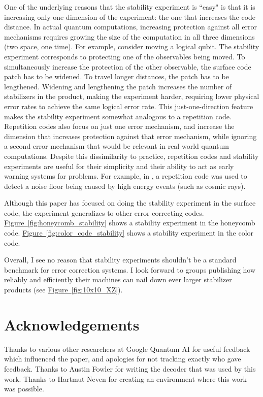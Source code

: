 \documentclass[onecolumn,unpublished,a4paper]{quantumarticle}
\theoremstyle{definition}
\theoremstyle{definition}
\theoremstyle{definition}
\newcommand{\fig}[1]{\hyperref[fig:#1]{Figure~\ref*{fig:#1}}}
\begin{document}
One of the underlying reasons that the stability experiment is ``easy" is that it is increasing only one dimension of the experiment: the one that increases the code distance.
In actual quantum computations, increasing protection against all error mechanisms requires growing the size of the computation in all three dimensions (two space, one time).
For example, consider moving a logical qubit.
The stability experiment corresponds to protecting one of the observables being moved.
To simultaneously increase the protection of the other observable, the surface code patch has to be widened.
To travel longer distances, the patch has to be lengthened.
Widening and lengthening the patch increases the number of stabilizers in the product, making the experiment harder, requiring lower physical error rates to achieve the same logical error rate.
This just-one-direction feature makes the stability experiment somewhat analogous to a repetition code.
Repetition codes also focus on just one error mechanism, and increase the dimension that increases protection against that error mechanism, while ignoring a second error mechanism that would be relevant in real world quantum computations.
Despite this dissimilarity to practice, repetition codes and stability experiments are useful for their simplicity and their ability to act as early warning systems for problems.
For example, in \cite{gqai2022suppressing}, a repetition code was used to detect a noise floor being caused by high energy events (such as cosmic rays).

Although this paper has focused on doing the stability experiment in the surface code, the experiment generalizes to other error correcting codes.
\fig{honeycomb_stability} shows a stability experiment in the honeycomb code.
\fig{color_code_stability} shows a stability experiment in the color code.

Overall, I see no reason that stability experiments shouldn't be a standard benchmark for error correction systems.
I look forward to groups publishing how reliably and efficiently their machines can nail down ever larger stabilizer products (see \fig{10x10_XZ}).

\section{Acknowledgements}

Thanks to various other researchers at Google Quantum AI for useful feedback which influenced the paper, and apologies for not tracking exactly who gave feedback.
Thanks to Austin Fowler for writing the decoder that was used by this work.
Thanks to Hartmut Neven for creating an environment where this work was possible.
\end{document}
